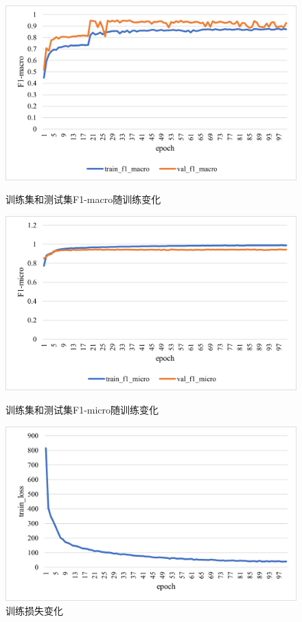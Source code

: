 \documentclass{article}
\begin{document}
	\begin{figure}[htbp]
		\centering
		\begin{minipage}[b]{0.3\textwidth}  
			\centering
			\includegraphics[width=\textwidth]{f1macro.png}
			\caption{训练集和测试集F1-macro随训练变化}
			\label{fig:f1macro}
		\end{minipage}
		\hspace{0.05\textwidth} 
		\begin{minipage}[b]{0.3\textwidth} 
			\centering
			\includegraphics[width=\textwidth]{f1micro.png}
			\caption{训练集和测试集F1-micro随训练变化}
			\label{fig:f1micro}
		\end{minipage}
		\hspace{0.05\textwidth}  
		\begin{minipage}[b]{0.3\textwidth}  
			\centering
			\includegraphics[width=\textwidth]{train_loss.png}
			\caption{训练损失变化}
			\label{fig:train_loss}
		\end{minipage}
	\end{figure}
	
\end{document}
